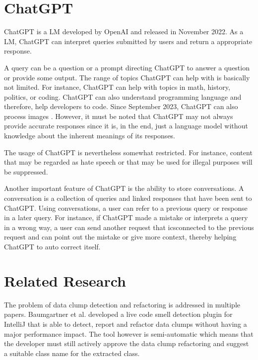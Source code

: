 \section{ChatGPT}

ChatGPT \cite{ChatGPT_url} is a \ac{LM} developed by OpenAI and released in November 2022. As a \ac{LM}, ChatGPT can interpret queries submitted by users and return a appropriate response. 

A query can be a question or a prompt directing ChatGPT to answer a question or provide some output. The range of topics ChatGPT can help with is basically not limited. For instance, ChatGPT can help with topics in math, history, politics, or coding. ChatGPT can also understand programming language and therefore, help developers to code. Since September 2023, ChatGPT can also process images \cite{ChatGPT_image}. However, it must be noted that ChatGPT may not always provide accurate responses since it is, in the end, just a language model without knowledge about the inherent meanings of its responses. 

The usage of ChatGPT is nevertheless somewhat restricted. For instance, content that may be regarded as hate speech or that may be used for illegal purposes will be suppressed.

Another important feature of ChatGPT is the ability to store conversations. A conversation is a collection of queries and linked responses that have been sent to ChatGPT. Using conversations, a user can refer to a previous query or response in a later query. For instance, if ChatGPT made a mistake or interprets a query in a wrong way, a user can send another request that icsconnected to the previous request and can point out the mistake or give more context, thereby helping ChatGPT to auto correct itself. 


\section{Related Research}
The problem of data clump detection and refactoring is addressed in multiple papers. 
Baumgartner et al.  developed a live code smell detection plugin for IntelliJ that is able to detect, report and refactor data clumps without having a major performance impact. The tool however is semi-automatic which means that the developer must still actively approve the data clump refactoring and suggest a suitable class name for the extracted class. \cite{BaumgartnerAP23}

